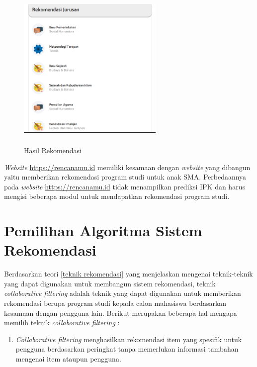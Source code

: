 \begin{enumerate}
    \begin{figure}[H]
        \centering
        \includegraphics[width = 7cm, height = 8cm ]{doc/DokumenSkripsi/Gambar/gambar36.PNG}
        \caption{Hasil Rekomendasi}
        \label{gambar36}
    \end{figure}
    
\end{enumerate}

\textit{Website} \url{https://rencanamu.id} memiliki kesamaan dengan \textit{website} yang dibangun yaitu memberikan rekomendasi program studi untuk anak SMA. Perbedaannya pada \textit{website} \url{https://rencanamu.id} tidak menampilkan prediksi IPK dan harus mengisi beberapa modul untuk mendapatkan rekomendasi program studi. 

\section{Pemilihan Algoritma Sistem Rekomendasi}
Berdasarkan teori \ref{teknik rekomendasi} yang menjelaskan mengenai teknik-teknik yang dapat digunakan untuk membangun sistem rekomendasi, teknik \textit{collaborative filtering} adalah teknik yang dapat digunakan untuk memberikan rekomendasi berupa program studi kepada calon mahasiswa berdasarkan kesamaan dengan pengguna lain. Berikut merupakan beberapa hal mengapa memilih teknik \textit{collaborative filtering} :

\begin{enumerate}
    \item \textit{Collaborative filtering} menghasilkan rekomendasi item yang spesifik untuk pengguna berdasarkan peringkat tanpa memerlukan informasi tambahan mengenai item ataupun pengguna.
    
\end{enumerate}

